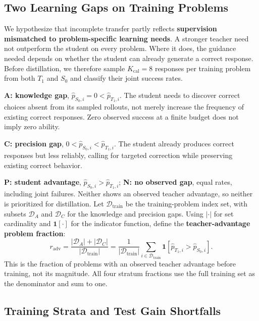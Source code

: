 \documentclass[10pt]{article}
\begin{document}
\subsection{Two Learning Gaps on Training Problems}

We hypothesize that incomplete transfer partly reflects \textbf{supervision
mismatched to problem-specific learning needs}.
A stronger teacher need not outperform the student on every problem.
Where it does, the guidance needed depends on whether the student can already
generate a correct response.
Before distillation, we therefore sample
$K_{\mathrm{cal}}=8$ responses per training problem from both $T_1$ and $S_0$
and classify their joint success rates.

\textbf{A: knowledge gap}, $\widehat p_{S_0,i}=0<\widehat p_{T_1,i}$.
The student needs to discover correct choices absent from its sampled rollouts,
not merely increase the frequency of existing correct responses.
Zero observed success at a finite budget does not imply zero ability.

\textbf{C: precision gap}, $0<\widehat p_{S_0,i}<\widehat p_{T_1,i}$.
The student already produces correct responses but less reliably, calling for
targeted correction while preserving existing correct behavior.

\textbf{P: student advantage}, $\widehat p_{S_0,i}>\widehat p_{T_1,i}$;
\textbf{N: no observed gap}, equal rates, including joint failures.
Neither shows an observed teacher advantage, so neither is prioritized for distillation.
Let $\mathcal D_{\mathrm{train}}$ be the training-problem index set, with subsets
$\mathcal D_A$ and $\mathcal D_C$ for the knowledge and precision gaps.
Using $|\cdot|$ for set cardinality and $\mathbf 1[\cdot]$ for the indicator
function, define the \textbf{teacher-advantage problem fraction}:
\begin{equation}
r_{\mathrm{adv}}=\frac{|\mathcal D_A|+|\mathcal D_C|}{|\mathcal D_{\mathrm{train}}|}
=\frac{1}{|\mathcal D_{\mathrm{train}}|}\sum_{i\in\mathcal D_{\mathrm{train}}}
\mathbf 1[\widehat p_{T_1,i}>\widehat p_{S_0,i}].
\label{eq:advantage-fraction}
\end{equation}
This is the fraction of problems with an observed teacher advantage before
training, not its magnitude. All four stratum fractions use the full training
set as the denominator and sum to one.

\subsection{Training Strata and Test Gain Shortfalls}
\end{document}

